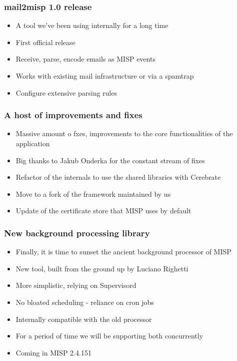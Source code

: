 \begin{frame}
\frametitle{mail2misp 1.0 release}
\begin{itemize}
	\item A tool we've been using internally for a long time
        \item First official release
        \item Receive, parse, encode emails as MISP events
        \item Works with existing mail infrastructure or via a spamtrap
        \item Configure extensive parsing rules
\end{itemize}
\end{frame}

\begin{frame}
\frametitle{A host of improvements and fixes}
\begin{itemize}
	\item Massive amount o fxes, improvements to the core functionalities of the application
        \item Big thanks to Jakub Onderka for the constant stream of fixes
        \item Refactor of the internals to use the shared libraries with Cerebrate
        \item Move to a fork of the framework maintained by us
        \item Update of the certificate store that MISP uses by default
\end{itemize}
\end{frame}

\begin{frame}
\frametitle{New background processing library}
\begin{itemize}
	\item Finally, it is time to sunset the ancient background processor of MISP
        \item New tool, built from the ground up by Luciano Righetti
        \item More simplistic, relying on Supervisord
        \item No bloated scheduling - reliance on cron jobs
        \item Internally compatible with the old processor
        \item For a period of time we will be supporting both concurrently
        \item Coming in MISP 2.4.151
\end{itemize}
\end{frame}

